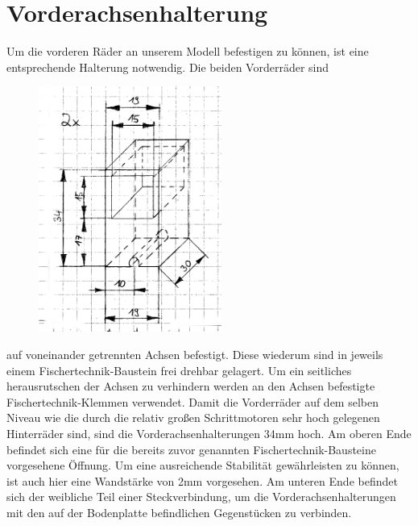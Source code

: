 \section{Vorderachsenhalterung}
Um die vorderen Räder an unserem Modell befestigen zu können, ist eine entsprechende Halterung notwendig. Die beiden Vorderräder sind 
\begin{figure}
	\includegraphics[width=6cm,angle=0]{content/pictures/vorderachsenhalterung.png}
\end{figure}
auf voneinander getrennten Achsen befestigt. Diese wiederum sind in jeweils einem Fischertechnik-Baustein frei drehbar gelagert. Um ein seitliches herausrutschen der Achsen zu verhindern werden an den Achsen befestigte Fischertechnik-Klemmen verwendet. Damit die Vorderräder auf dem selben Niveau wie die durch die relativ großen Schrittmotoren sehr hoch gelegenen Hinterräder sind, sind die Vorderachsenhalterungen 34mm hoch. Am oberen Ende befindet sich eine für die bereits zuvor genannten Fischertechnik-Bausteine vorgesehene Öffnung. Um eine ausreichende Stabilität gewährleisten zu können, ist auch hier eine Wandstärke von 2mm vorgesehen. Am unteren Ende befindet sich der weibliche Teil einer Steckverbindung, um die Vorderachsenhalterungen mit den auf der Bodenplatte befindlichen Gegenstücken zu verbinden.

